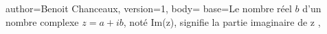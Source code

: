 {
author={Benoit Chanceaux},
version={1},
body={
base={Le nombre réel {{{$b$}}} d’un nombre complexe ${{{z}}} = {{{a}}} + {{{i}}} {{{b}}}$, noté Im({{{z}}}), signifie la partie imaginaire de {{{z}}}}
},
}